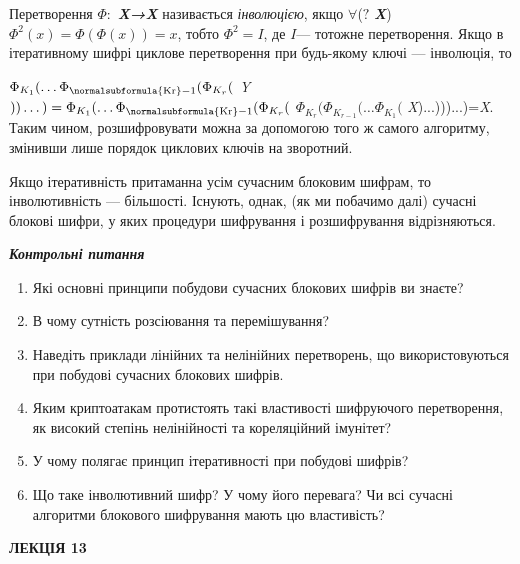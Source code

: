 Перетворення  $\Phi :$
\textbf{\textit{X}}\textbf{\textit{→}}\textbf{\textit{X}}\textbf{\textit{
}}називається \textit{інволюцією}, якщо  $\forall $(\textitx $?$
\textbf{\textit{X}})\textbf{\textit{ }} $\Phi ^2(x)=\Phi (\Phi (x))=x$,
тобто  $\Phi ^2=I$, де  $I$--- тотожне перетворення. Якщо в ітеративному
шифрі циклове перетворення при будь-якому ключі --- інволюція, то 

 ${\Phi _{K_{{1}}}(\dots\Phi
_{\normalsubformula{\text{Kr}}-1}{(\Phi _{K_{r}}}{(}}$ \textit{Y}
${))\dots)=\Phi _{K_{{1}}}(\dots\Phi
_{\normalsubformula{\text{Kr}}-1}{(\Phi _{K_{r}}}{(}}$  ${\Phi
_{K_{{r}}}(\Phi _{K_{r-1}}{(\dots\Phi _{K_{1}}}{(}}$
\textit{X})...)))...)=\textit{X}. Таким чином, розшифровувати можна за
допомогою того ж самого алгоритму, змінивши лише порядок циклових ключів на
зворотний.

Якщо ітеративність притаманна усім сучасним блоковим шифрам, то інволютивність ---
більшості. Існують, однак, (як ми побачимо далі) сучасні блокові шифри, у яких
процедури шифрування  і розшифрування  відрізняються.


\bigskip

{\centering\bfseries\itshape
Контрольні питання
\par}


\bigskip


\bigskip

\liststyleWWviiiNumxlviii
\begin{enumerate}
\item Які основні принципи побудови сучасних блокових шифрів ви знаєте?
\item В чому сутність розсіювання та перемішування?
\item Наведіть приклади лінійних та нелінійних перетворень, що використовуються
при побудові сучасних блокових шифрів.
\item Яким криптоатакам протистоять такі властивості шифруючого перетворення, як
високий степінь нелінійності та кореляційний імунітет?
\item У чому полягає принцип ітеративності при побудові шифрів?
\item Що таке інволютивний шифр? У чому його перевага? Чи всі сучасні алгоритми
блокового шифрування мають цю властивість?
\end{enumerate}

\bigskip


\bigskip

{\bfseries
ЛЕКЦІЯ  13}


\bigskip

